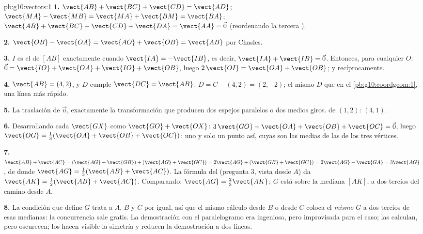 \begin{solution}{pb:g10:vectors:1}
\textbf{1.} $\vect{AB} + \vect{BC} + \vect{CD} = \vect{AD}$; \quad
$\vect{MA} - \vect{MB} = \vect{MA} + \vect{BM} = \vect{BA}$; \quad
$\vect{AB} + \vect{BC} + \vect{CD} + \vect{DA} = \vect{AA} = \vec 0$
(reordenando la tercera ).

\textbf{2.} $\vect{OB} - \vect{OA} = \vect{AO} + \vect{OB} = \vect{AB}$
por Chasles.

\textbf{3.} $I$ es el  de $[AB]$ exactamente cuando
$\vect{IA} = -\vect{IB}$, es decir, $\vect{IA} + \vect{IB} = \vec 0$.
Entonces, para cualquier $O$:
$\vec 0 = \vect{IO} + \vect{OA} + \vect{IO} + \vect{OB}$, luego
$2\,\vect{OI} = \vect{OA} + \vect{OB}$; y recíprocamente.

\textbf{4.} $\vect{AB} = (4, 2)$, y $D$ cumple $\vect{DC} = \vect{AB}$:
$D = C - (4, 2) = (2, -2)$; el mismo $D$ que en el
\cref{pb:g10:coordgeom:1}, una línea más rápido.

\textbf{5.} La traslación de  $\vec u$, exactamente la
transformación que producen dos espejos paralelos o dos medios giros.
 de $(1, 2)$: $(4, 1)$.

\textbf{6.} Desarrollando cada $\vect{GX}$ como $\vect{GO} + \vect{OX}$:
$3\,\vect{GO} + \vect{OA} + \vect{OB} + \vect{OC} = \vec 0$, luego
$\vect{OG} = \frac13(\vect{OA} + \vect{OB} + \vect{OC})$: uno y solo un
punto así, cuyas  son las medias de las de los tres vértices.

\textbf{7.} $\vect{AB} + \vect{AC} =
(\vect{AG} + \vect{GB}) + (\vect{AG} + \vect{GC})
= 2\vect{AG} + (\vect{GB} + \vect{GC})
= 2\vect{AG} - \vect{GA} = 3\vect{AG}$, de donde
$\vect{AG} = \frac13(\vect{AB} + \vect{AC})$. La fórmula del 
(pregunta 3, vista desde $A$) da
$\vect{AK} = \frac12(\vect{AB} + \vect{AC})$. Comparando:
$\vect{AG} = \frac23\vect{AK}$; $G$ está sobre la mediana $[AK]$, a dos
tercios del camino desde $A$.

\textbf{8.} La condición que define $G$ trata a $A$, $B$ y $C$ por igual,
así que el mismo cálculo desde $B$ o desde $C$ coloca el \emph{mismo} $G$
a dos tercios de esas medianas: la concurrencia sale gratis. La
demostración con el paralelogramo era ingeniosa, pero improvisada para el
caso; las  calculan, pero oscurecen; los  hacen visible
la simetría y reducen la demostración a dos líneas.


\end{solution}
